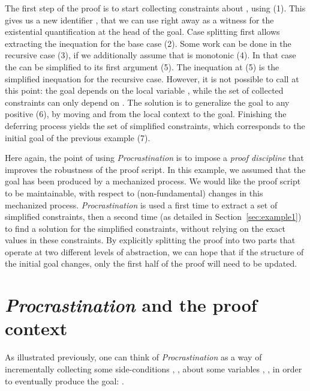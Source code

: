 \documentclass[xetex,format=acmlarge,screen=true,authorversion=true]{acmart-modified}
\begin{document}
\vspace{1em}



\vspace{1em}

The first step of the proof is to start collecting constraints about ,
using  (1). This gives us a new identifier
, that we can use right away as a witness for the existential
quantification at the head of the goal. Case splitting first allows extracting
the inequation for the base case (2). Some work can be done in the recursive
case (3), if we additionally assume that  is monotonic (4). In that case
the  can be simplified to its first argument (5). The inequation at
(5) is the simplified inequation for the recursive case. However, it is not
possible to call  at this point: the goal depends on the local
variable , while the set of collected constraints can only depend on
. The solution is to generalize the goal to any positive  (6), by
moving  and  from the local context to the goal. Finishing the
deferring process yields the set of simplified constraints, which corresponds to
the initial goal of the previous example (7).

Here again, the point of using \emph{Procrastination} is to impose a \emph{proof
  discipline} that improves the robustness of the proof script. In this example,
we assumed that the goal has been produced by a mechanized process. We would
like the proof script to be maintainable, with respect to (non-fundamental)
changes in this mechanized process. \emph{Procrastination} is used a first time
to extract a set of simplified constraints, then a second time (as detailed in
Section~\ref{sec:example1}) to find a solution for the simplified constraints,
without relying on the exact values in these constraints. By explicitly
splitting the proof into two parts that operate at two different levels of
abstraction, we can hope that if the structure of the initial goal changes, only
the first half of the proof will need to be updated.

\section{\emph{Procrastination} and the proof context}

As illustrated previously, one can think of \emph{Procrastination} as a way of
incrementally collecting some side-conditions , ,  about some
variables , ,  in order to eventually produce the goal:
.
\end{document}
